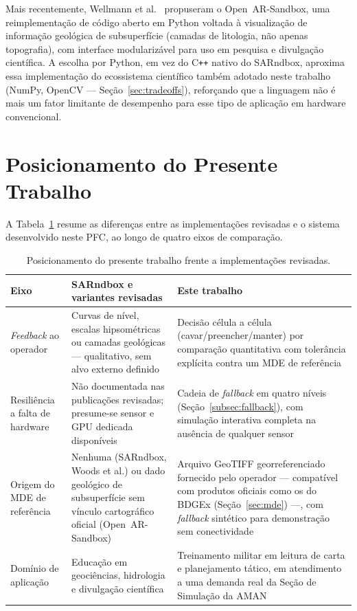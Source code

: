 Mais recentemente, Wellmann et al.~ propuseram o
Open~AR-Sandbox, uma reimplementação de código aberto em
Python voltada à visualização de informação geológica de subsuperfície
(camadas de litologia, não apenas topografia), com interface
modularizável para uso em pesquisa e divulgação científica. A escolha
por Python, em vez do C\texttt{++} nativo do SARndbox, aproxima essa
implementação do ecossistema científico também adotado neste trabalho
(NumPy, OpenCV — Seção~\ref{sec:tradeoffs}), reforçando que a
linguagem não é mais um fator limitante de desempenho para esse tipo
de aplicação em hardware convencional.

\section{Posicionamento do Presente Trabalho}
\label{sec:posicionamento}

A Tabela~\ref{tab:relacionados} resume as diferenças entre as
implementações revisadas e o sistema desenvolvido neste PFC, ao longo
de quatro eixos de comparação.

\begin{table}[!ht]
\centering
\caption{Posicionamento do presente trabalho frente a implementações revisadas.}
\label{tab:relacionados}
\small
\begin{tabularx}{\textwidth}{@{}l X X@{}}
\toprule
\textbf{Eixo} & \textbf{SARndbox e variantes revisadas} & \textbf{Este trabalho} \\
\midrule
\textit{Feedback} ao operador &
Curvas de nível, escalas hipsométricas ou camadas geológicas —
qualitativo, sem alvo externo definido &
Decisão célula a célula (cavar/preencher/manter) por comparação
quantitativa com tolerância explícita contra um MDE de referência \\
\addlinespace
Resiliência a falta de hardware &
Não documentada nas publicações revisadas; presume-se sensor e GPU
dedicada disponíveis &
Cadeia de \textit{fallback} em quatro níveis
(Seção~\ref{subsec:fallback}), com simulação interativa completa na
ausência de qualquer sensor \\
\addlinespace
Origem do MDE de referência &
Nenhuma (SARndbox, Woods et al.) ou dado geológico de subsuperfície
sem vínculo cartográfico oficial (Open~AR-Sandbox) &
Arquivo GeoTIFF georreferenciado fornecido pelo operador — compatível
com produtos oficiais como os do BDGEx (Seção~\ref{sec:mde}) —, com
\textit{fallback} sintético para demonstração sem conectividade \\
\addlinespace
Domínio de aplicação &
Educação em geociências, hidrologia e divulgação científica &
Treinamento militar em leitura de carta e planejamento tático, em
atendimento a uma demanda real da Seção de Simulação da AMAN \\
\bottomrule
\end{tabularx}
\end{table}

